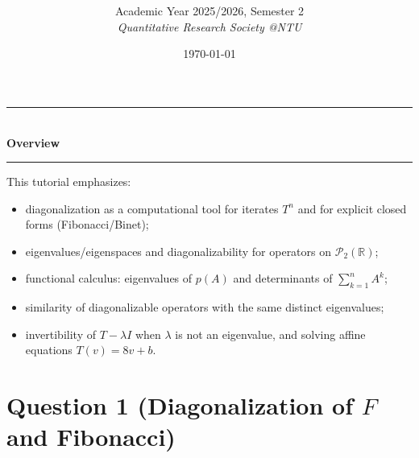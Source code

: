 \documentclass[12pt]{article}
\title{
\CourseCode\ \CourseName \\[0.3em]
\large \DocType
}
\author{
  Academic Year 2025/2026, Semester 2 \\[0.25em]
  \textit{Quantitative Research Society @NTU}
}
\date{\today}
\newcommand{\R}{\mathbb{R}}
\newcommand{\cP}{\mathcal{P}}
\begin{document}
\maketitle
\thispagestyle{plainfirst}
\pagestyle{main}

\begin{center}
  \rule{0.8\textwidth}{0.4pt}\\[4pt]
  \textbf{Overview}\\[2pt]
  \rule{0.8\textwidth}{0.4pt}
\end{center}

\noindent
This tutorial emphasizes:
\begin{itemize}[leftmargin=*]
  \item diagonalization as a computational tool for iterates $T^n$ and for explicit closed forms (Fibonacci/Binet);
  \item eigenvalues/eigenspaces and diagonalizability for operators on $\cP_2(\R)$;
  \item functional calculus: eigenvalues of $p(A)$ and determinants of $\sum_{k=1}^n A^k$;
  \item similarity of diagonalizable operators with the same distinct eigenvalues;
  \item invertibility of $T-\lambda I$ when $\lambda$ is not an eigenvalue, and solving affine equations $T(v)=8v+b$.
\end{itemize}
\newpage
\tableofcontents
\newpage

\section{Question 1 (Diagonalization of $F$ and Fibonacci)}
\end{document}
